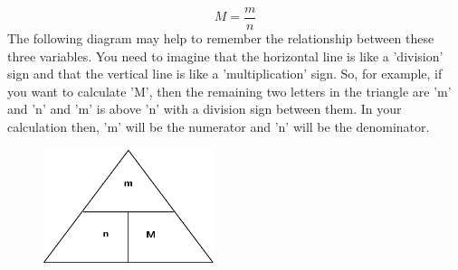     \begin{equation}
    M=\frac{m}{n}\tag{18.5}
      \end{equation}
      \label{m38717*id277605}The following diagram may help to remember the relationship between these three variables. You need to imagine that the horizontal line is like a 'division' sign and that the vertical line is like a 'multiplication' sign. So, for example, if you want to calculate 'M', then the remaining two letters in the triangle are 'm' and 'n' and 'm' is above 'n' with a division sign between them. In your calculation then, 'm' will be the numerator and 'n' will be the denominator.\par 
      \label{m38717*id277613}
    \setcounter{subfigure}{0}
	\begin{figure}[H] %
    \begin{center}
    \label{m38717*id277616!!!underscore!!!media}\label{m38717*id277616!!!underscore!!!printimage}\includegraphics[width=5cm]{col11305.imgs/m38717_CG11C6_001.png} %
      \vspace{2pt}
    \vspace{.1in}
    \end{center}
 \end{figure}       
      \par 
\label{m38717*secfhsst!!!underscore!!!id409}\vspace{.5cm} 
      \noindent
